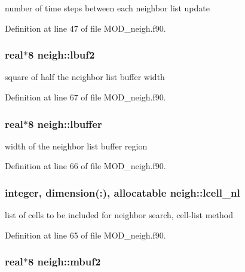 number of time steps between each neighbor list update 



Definition at line 47 of file M\-O\-D\-\_\-neigh.\-f90.

\hypertarget{classneigh_aee6d4c42a6432bbfb95bd9eae5c696a7}{
\subsubsection[{lbuf2}]{\setlength{\rightskip}{0pt plus 5cm}real$\ast$8 neigh\-::lbuf2}}\label{classneigh_aee6d4c42a6432bbfb95bd9eae5c696a7}


square of half the neighbor list buffer width 



Definition at line 67 of file M\-O\-D\-\_\-neigh.\-f90.

\hypertarget{classneigh_a66df6ef3bac2d5562b59b6883a6ae4da}{
\subsubsection[{lbuffer}]{\setlength{\rightskip}{0pt plus 5cm}real$\ast$8 neigh\-::lbuffer}}\label{classneigh_a66df6ef3bac2d5562b59b6883a6ae4da}


width of the neighbor list buffer region 



Definition at line 66 of file M\-O\-D\-\_\-neigh.\-f90.

\hypertarget{classneigh_a99c01d6af3f1b175846fa65ca70f7d9b}{
\subsubsection[{lcell\-\_\-nl}]{\setlength{\rightskip}{0pt plus 5cm}integer, dimension(\-:), allocatable neigh\-::lcell\-\_\-nl}}\label{classneigh_a99c01d6af3f1b175846fa65ca70f7d9b}


list of cells to be included for neighbor search, cell-\/list method 



Definition at line 65 of file M\-O\-D\-\_\-neigh.\-f90.

\hypertarget{classneigh_ad76c9a558fd93db7cba1761d4580c929}{
\subsubsection[{mbuf2}]{\setlength{\rightskip}{0pt plus 5cm}real$\ast$8 neigh\-::mbuf2}}\label{classneigh_ad76c9a558fd93db7cba1761d4580c929}


